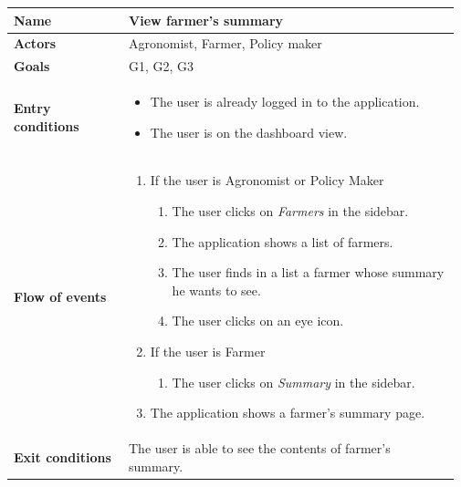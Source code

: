 \begin{table}[H]
    \centering
	\begin{tabular}{@{}p{0.25\linewidth} p{0.72\linewidth}@{}}
    \toprule
		\textbf{Name}               & View farmer's summary\\
		\midrule
		\textbf{Actors}             & Agronomist, Farmer, Policy maker\\
		\midrule
		\textbf{Goals}              & G1, G2, G3 \\
		\midrule
		
		\textbf{Entry conditions}   & \begin{itemize}[leftmargin=.4cm,noitemsep,topsep=0pt,before=\vspace{-3mm},after=\vspace{-4mm}]
		    \item The user is already logged in to the application.
		    \item The user is on the dashboard view.
		\end{itemize}\\
		\midrule
		
		\textbf{Flow of events}     & \begin{enumerate}[leftmargin=.4cm,noitemsep,topsep=0pt,before=\vspace{-3mm},after=\vspace{-4mm}]
		    \item If the user is Agronomist or Policy Maker
		    \begin{enumerate}[noitemsep]
		        \item The user clicks on \textit{Farmers} in the sidebar.
		        \item The application shows a list of farmers.
		        \item The user finds in a list a farmer whose summary he wants to see.
		        \item The user clicks on an eye icon.
		    \end{enumerate}
		    \item If the user is Farmer
		    \begin{enumerate}[noitemsep]
		        \item The user clicks on \textit{Summary} in the sidebar.
		    \end{enumerate}
		    \item The application shows a farmer's summary page.
		\end{enumerate}\\
		\midrule
		\textbf{Exit conditions}    & The user is able to see the contents of farmer's summary. \\
		\midrule
		

\end{tabular}
\end{table}
